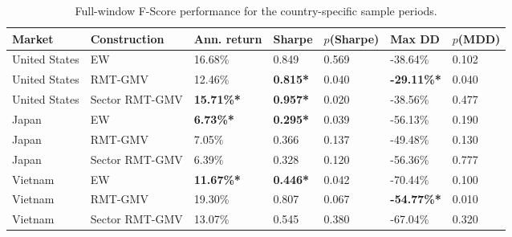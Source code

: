 \documentclass[11pt,a4paper]{report}
\numberwithin{figure}{chapter}
\numberwithin{table}{chapter}
\numberwithin{equation}{chapter}
\begin{document}
\begin{table}[H]
\centering
\scriptsize
\caption{Full-window F-Score performance for the country-specific sample periods.}
\label{tab:full_window_appendix}

\setlength{\tabcolsep}{2.5pt}

\begin{tabular}{
@{}
M{0.13\textwidth}
M{0.18\textwidth}
M{0.105\textwidth}
M{0.09\textwidth}
M{0.10\textwidth}
M{0.11\textwidth}
M{0.10\textwidth}
@{}
}
\hline
\textbf{Market} &
\textbf{Construction} &
\textbf{Ann. return} &
\textbf{Sharpe} &
\textbf{$p$(Sharpe)} &
\textbf{Max DD} &
\textbf{$p$(MDD)} \\
\hline

United States
& EW
& 16.68\%
& 0.849
& 0.569
& -38.64\%
& 0.102 \\
\hline{}

United States
& RMT-GMV
& 12.46\%
& \textbf{0.815*}
& 0.040
& \textbf{-29.11\%*}
& 0.040 \\
\hline{}

United States
& Sector RMT-GMV
& \textbf{15.71\%*}
& \textbf{0.957*}
& 0.020
& -38.56\%
& 0.477 \\
\hline{}

Japan
& EW
& \textbf{6.73\%*}
& \textbf{0.295*}
& 0.039
& -56.13\%
& 0.190 \\
\hline{}

Japan
& RMT-GMV
& 7.05\%
& 0.366
& 0.137
& -49.48\%
& 0.130 \\
\hline{}

Japan
& Sector RMT-GMV
& 6.39\%
& 0.328
& 0.120
& -56.36\%
& 0.777 \\
\hline{}

Vietnam
& EW
& \textbf{11.67\%*}
& \textbf{0.446*}
& 0.042
& -70.44\%
& 0.100 \\
\hline{}

Vietnam
& RMT-GMV
& 19.30\%
& 0.807
& 0.067
& \textbf{-54.77\%*}
& 0.010 \\
\hline{}

Vietnam
& Sector RMT-GMV
& 13.07\%
& 0.545
& 0.380
& -67.04\%
& 0.320 \\

\hline
\end{tabular}
\end{table}
\end{document}
